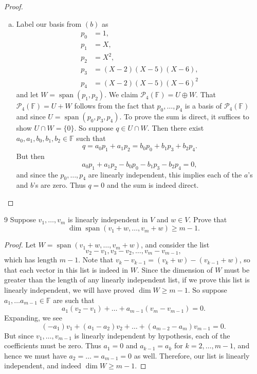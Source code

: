 \documentclass{extarticle}
\newenvironment{problem}[1]{\begin{prob*}{#1}{}}{\end{prob*}}
\newcommand{\F}{\mathbb{F}}
\DeclareMathOperator{\Span}{span}
\begin{document}
\begin{proof}
\begin{enumerate}[(a)]
\item Label our basis from $(b)$ as
\begin{align*}
p_0 &= 1, \\ p_1 &= X,\\ p_2 &= X^2,\\ p_3 &= (X - 2)(X-5)(X-6), \\ p_4 &= (X-2)(X-5)(X-6)^2
\end{align*}
and let $W = \Span(p_1, p_2)$.  We claim $\mathcal{P}_4(\F) = U\oplus W$.  That $\mathcal{P}_4(\F) = U + W$ follows from the fact that $p_0,\dots, p_4$ is a basis of $\mathcal{P}_4(\F)$ and since $U = \Span(p_0, p_3, p_4)$.  To prove the sum is direct, it suffices to show $U\cap W=\{0\}$.  So suppose $q\in U\cap W$.  Then there exist $a_0, a_1, b_0, b_1, b_2\in\F$ such that 
\begin{equation*}
q = a_0p_1 + a_1 p_2 = b_0p_0 + b_1 p_3 + b_2 p_4.
\end{equation*}
But then
\begin{equation*}
a_0p_1 + a_1 p_2 - b_0p_0 - b_1 p_3 - b_2 p_4 = 0,
\end{equation*}
and since the $p_0,\dots,p_4$ are linearly independent, this implies each of the $a$'s and $b$'s are zero.  Thus $q=0$ and the sum is indeed direct. \qedhere
\end{enumerate}
\end{proof}

\begin{problem}{9}
Suppose $v_1,\dots, v_m$ is linearly independent in $V$ and $w\in V$.  Prove that 
\begin{equation*}
\dim\Span(v_1 + w, \dots, v_m + w)\geq m - 1.
\end{equation*}
\end{problem}
\begin{proof}
Let $W = \Span(v_1 + w, \dots, v_m + w)$, and consider the list
\begin{equation*}
v_2 - v_1, v_3 - v_2,\dots, v_m - v_{m-1},
\end{equation*}
which has length $m - 1$.  Note that $v_k - v_{k - 1} = (v_k + w) - (v_{k - 1} + w)$, so that each vector in this list is indeed in $W$.  Since the dimension of $W$ must be greater than the length of any linearly independent list, if we prove this list is linearly independent, we will have proved $\dim W\geq m - 1$.  So suppose $a_1,\dots a_{m - 1}\in\F$ are such that 
\begin{equation*}
a_1(v_2 - v_1) + \dots + a_{m-1}(v_m - v_{m-1}) = 0.
\end{equation*}
Expanding, we see
\begin{equation*}
(-a_1)v_1 + (a_1 - a_2)v_2 + \dots + (a_{m-2} - a_m)v_{m-1} = 0.
\end{equation*}
But since $v_1,\dots,v_{m-1}$ is linearly independent by hypothesis, each of the coefficients must be zero.  Thus $a_1 = 0$ and $a_{k-1} = a_{k}$ for $k = 2, \dots, m- 1$, and hence we must have $a_2=\dots = a_{m-1}=0$ as well.  Therefore, our list is linearly independent, and indeed $\dim W \geq m-1$.
\end{proof}
\end{document}
